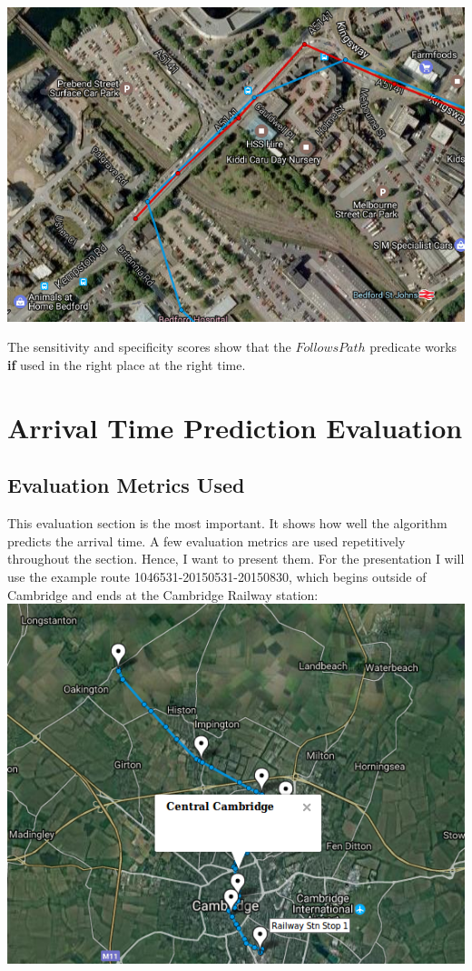 \documentclass[12pt,a4paper,oneside,openright]{report}
\begin{document}
\includegraphics[scale = 0.6]{figs/misclassified_trip.png}

The sensitivity and specificity scores show that the $FollowsPath$
predicate works \textbf{if} used in the right place at the right time.

\newpage

\section{Arrival Time Prediction Evaluation}

\subsection{Evaluation Metrics Used}

This evaluation section is the most important. It shows how well the algorithm
predicts the arrival time. A few evaluation metrics are used repetitively
throughout the section. Hence, I want to present them. For the presentation I
will use the example route 1046531-20150531-20150830, which begins outside of
Cambridge and ends at the Cambridge Railway station: \\

\includegraphics[width=\textwidth]{figs/cambridge_route.png} \\
\end{document}
